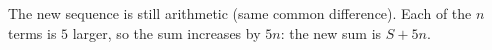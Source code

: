 The new sequence is still arithmetic (same common difference). Each of the $n$ terms is $5$ larger, so the sum increases by $5n$: the new sum is $\boxed{S+5n}$.
